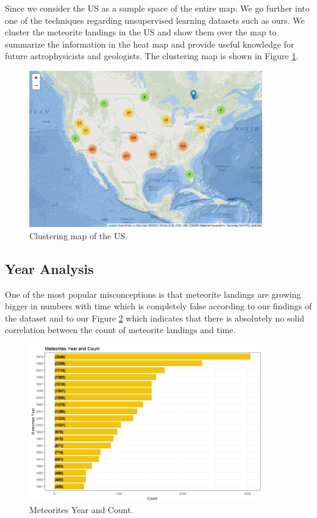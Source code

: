 Since we consider the US as a sample space of the entire map. We go further into one of the techniques regarding unsupervised learning datasets such as ours. We cluster the meteorite landings in the US and show them over the map to summarize the information in the heat map and provide useful knowledge for future astrophysicists and geologists. The clustering map is shown in Figure \ref{fig:fig19}.
\begin{figure}
	\centering
	\includegraphics[width=0.9\textwidth]{Figures/19ClusterMarkersUS.jpeg}
	\caption{\label{fig:fig19}  Clustering map of the US.}
\end{figure}

\subsection{Year Analysis}
One of the most popular misconceptions is that meteorite landings are growing bigger in numbers with time which is completely false according to our findings of the dataset and to our Figure \ref{fig:fig20} which indicates that there is absolutely no solid correlation between the count of meteorite landings and time.
\begin{figure}
	\centering
	\includegraphics[width=0.9\textwidth]{Figures/20YearAnalysis.jpeg}
	\caption{\label{fig:fig20}  Meteorites Year and Count.}
\end{figure}

